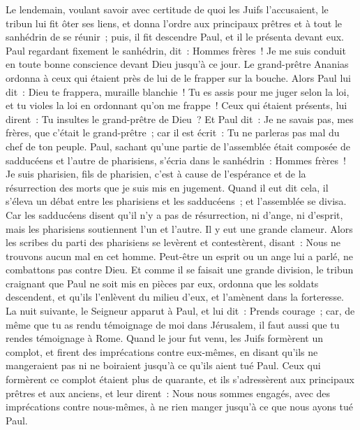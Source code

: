\begin{multicols}{2}
Le lendemain, voulant savoir avec certitude de quoi les Juifs l'accusaient, le tribun lui fit ôter ses liens, et donna l'ordre aux principaux prêtres et à tout le sanhédrin de se réunir~; puis, il fit descendre Paul, et il le présenta devant eux.
\VerseOne{}Paul regardant fixement le sanhédrin, dit~: Hommes frères~! Je me suis conduit en toute bonne conscience devant Dieu jusqu'à ce jour.
Le grand-prêtre Ananias ordonna à ceux qui étaient près de lui de le frapper sur la bouche.
Alors Paul lui dit~: Dieu te frappera, muraille blanchie~! Tu es assis pour me juger selon la loi, et tu violes la loi en ordonnant qu'on me frappe~!
Ceux qui étaient présents, lui dirent~: Tu insultes le grand-prêtre de Dieu~?
Et Paul dit~: Je ne savais pas, mes frères, que c'était le grand-prêtre~; car il est écrit~: Tu ne parleras pas mal du chef de ton peuple.
Paul, sachant qu'une partie de l'assemblée était composée de sadducéens et l'autre de pharisiens, s'écria dans le sanhédrin~: Hommes frères~! Je suis pharisien, fils de pharisien, c'est à cause de l'espérance et de la résurrection des morts que je suis mis en jugement.
Quand il eut dit cela, il s'éleva un débat entre les pharisiens et les sadducéens~; et l'assemblée se divisa.
Car les sadducéens disent qu'il n'y a pas de résurrection, ni d'ange, ni d'esprit, mais les pharisiens soutiennent l'un et l'autre.
Il y eut une grande clameur. Alors les scribes du parti des pharisiens se levèrent et contestèrent, disant~: Nous ne trouvons aucun mal en cet homme. Peut-être un esprit ou un ange lui a parlé, ne combattons pas contre Dieu.
Et comme il se faisait une grande division, le tribun craignant que Paul ne soit mis en pièces par eux, ordonna que les soldats descendent, et qu'ils l'enlèvent du milieu d'eux, et l'amènent dans la forteresse.
La nuit suivante, le Seigneur apparut à Paul, et lui dit~: Prends courage~; car, de même que tu as rendu témoignage de moi dans Jérusalem, il faut aussi que tu rendes témoignage à Rome.
Quand le jour fut venu, les Juifs formèrent un complot, et firent des imprécations contre eux-mêmes, en disant qu'ils ne mangeraient pas ni ne boiraient jusqu'à ce qu'ils aient tué Paul.
Ceux qui formèrent ce complot étaient plus de quarante,
et ils s'adressèrent aux principaux prêtres et aux anciens, et leur dirent~: Nous nous sommes engagés, avec des imprécations contre nous-mêmes, à ne rien manger jusqu'à ce que nous ayons tué Paul.

\end{multicols}
